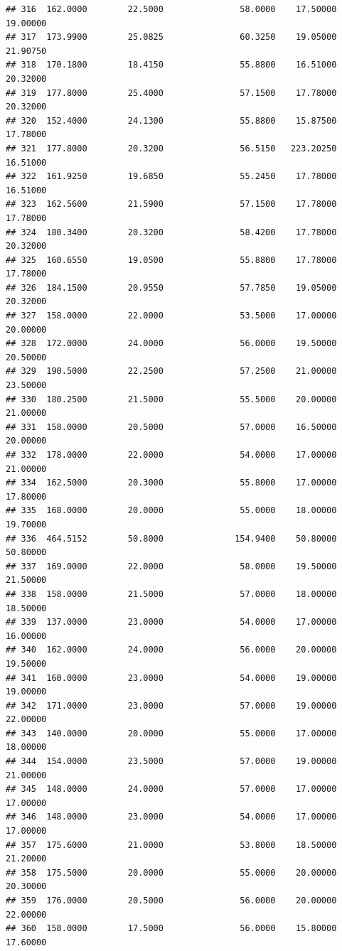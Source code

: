 \documentclass[]{article}
\begin{document}
\begin{verbatim}
## 316  162.0000        22.5000               58.0000    17.50000   19.00000
## 317  173.9900        25.0825               60.3250    19.05000   21.90750
## 318  170.1800        18.4150               55.8800    16.51000   20.32000
## 319  177.8000        25.4000               57.1500    17.78000   20.32000
## 320  152.4000        24.1300               55.8800    15.87500   17.78000
## 321  177.8000        20.3200               56.5150   223.20250   16.51000
## 322  161.9250        19.6850               55.2450    17.78000   16.51000
## 323  162.5600        21.5900               57.1500    17.78000   17.78000
## 324  180.3400        20.3200               58.4200    17.78000   20.32000
## 325  160.6550        19.0500               55.8800    17.78000   17.78000
## 326  184.1500        20.9550               57.7850    19.05000   20.32000
## 327  158.0000        22.0000               53.5000    17.00000   20.00000
## 328  172.0000        24.0000               56.0000    19.50000   20.50000
## 329  190.5000        22.2500               57.2500    21.00000   23.50000
## 330  180.2500        21.5000               55.5000    20.00000   21.00000
## 331  158.0000        20.5000               57.0000    16.50000   20.00000
## 332  178.0000        22.0000               54.0000    17.00000   21.00000
## 334  162.5000        20.3000               55.8000    17.00000   17.80000
## 335  168.0000        20.0000               55.0000    18.00000   19.70000
## 336  464.5152        50.8000              154.9400    50.80000   50.80000
## 337  169.0000        22.0000               58.0000    19.50000   21.50000
## 338  158.0000        21.5000               57.0000    18.00000   18.50000
## 339  137.0000        23.0000               54.0000    17.00000   16.00000
## 340  162.0000        24.0000               56.0000    20.00000   19.50000
## 341  160.0000        23.0000               54.0000    19.00000   19.00000
## 342  171.0000        23.0000               57.0000    19.00000   22.00000
## 343  140.0000        20.0000               55.0000    17.00000   18.00000
## 344  154.0000        23.5000               57.0000    19.00000   21.00000
## 345  148.0000        24.0000               57.0000    17.00000   17.00000
## 346  148.0000        23.0000               54.0000    17.00000   17.00000
## 357  175.6000        21.0000               53.8000    18.50000   21.20000
## 358  175.5000        20.0000               55.0000    20.00000   20.30000
## 359  176.0000        20.5000               56.0000    20.00000   22.00000
## 360  158.0000        17.5000               56.0000    15.80000   17.60000

\end{verbatim}
\end{document}
